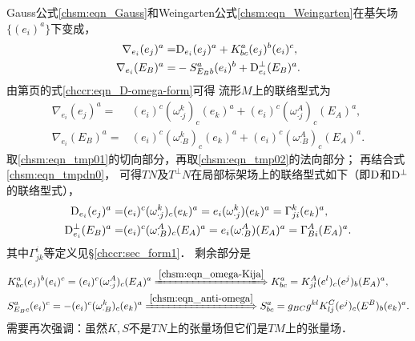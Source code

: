 
Gauss公式\eqref{chsm:eqn_Gauss}和Weingarten公式\eqref{chsm:eqn_Weingarten}在基矢场$\{(e_i)^a\}$下变成，
\begin{equation}\label{chsm:eqn_tmpdn0}
    \begin{aligned}
    {\nabla}_{e_i} (e_j)^a =& {\rm D}_{e_i} (e_j)^a + K^a_{bc} (e_j)^b (e_i)^c, \\
    {\nabla}_{e_i} (E_B)^a =& - S^a_{E_B b} (e_i)^b + {\rm D}_{e_i} ^\bot (E_B)^a .
    \end{aligned}
\end{equation}
由第\pageref{chccr:eqn_D-omega-form}页的式\eqref{chccr:eqn_D-omega-form}可得
流形$M$上的联络型式为
\begin{align}
    \nabla_{e_i} (e_j)^a=  &(e_i)^c(\omega_{\cdot j}^{k})_c (e_k)^a +(e_i)^c(\omega_{\cdot j}^{A})_c
    (E_A)^a, \label{chsm:eqn_tmp01} \\
    \nabla_{e_i} (E_B)^a=&(e_i)^c (\omega_{\cdot B}^{k})_c (e_k)^a +(e_i)^c(\omega_{\cdot B}^{A})_c
    (E_A)^a. \label{chsm:eqn_tmp02}
\end{align}
取\eqref{chsm:eqn_tmp01}的切向部分，再取\eqref{chsm:eqn_tmp02}的法向部分；
再结合式\eqref{chsm:eqn_tmpdn0}，
可得$T N$及$T^\bot N$在局部标架场上的联络型式如下（即${\rm D}$和${\rm D}^\bot$的联络型式），
\begin{align}
    {\rm D}_{e_i} (e_j)^a=&  (e_i)^c(\omega_{\cdot j}^{k})_c (e_k)^a
    = e_i(\omega_{\cdot j}^{k}) (e_k)^a = \Gamma_{ji}^{k} (e_k)^a , \label{chsm:eqn_Dij} \\
    {\rm D}^\bot_{e_i} (E_B)^a=& (e_i)^c(\omega_{\cdot B}^{A})_c (E_A)^a
    =e_i(\omega_{\cdot B}^{A}) (E_A)^a =\Gamma_{B i}^{A} (E_A)^a .
    \label{chsm:eqn_Dbotimu}
\end{align}
其中$\Gamma^i_{jk}$等定义见\S\ref{chccr:sec_form1}．
剩余部分是
\setlength{\mathindent}{0em}
\begin{align}
    &K^a_{bc} (e_j)^b (e_i)^c = (e_i)^c(\omega_{\cdot j}^{A})_c (E_A)^a
    \xLongrightarrow{\ref{chsm:eqn_omega-Kija}}
    K^a_{bc} %
    = K^A_{jl} (e^l)_c (e^j)_b (E_A)^a ,  \label{chsm:eqn_K-omega} \\
    &S^a_{E_B c} (e_i)^c = -(e_i)^c (\omega_{\cdot B}^{k})_c (e_k)^a
    \xLongrightarrow{\ref{chsm:eqn_anti-omega}}
    S^a_{bc}  %
    = g_{B C} g^{kl} K_{lj}^C (e^j)_c (E^B)_b (e_k)^a . \label{chsm:eqn_S-omega}
\end{align}\setlength{\mathindent}{2em}
需要再次强调：虽然$K,S$不是$TN$上的张量场但它们是$TM$上的张量场．

